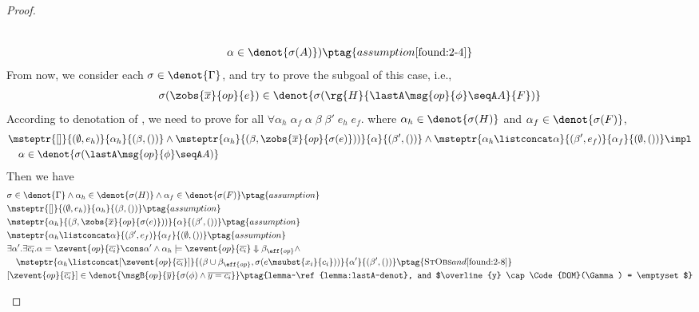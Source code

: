\begin{proof}
\begin{enumerate}[label=Case]
{\begin{alignat}{2}
\\&\quad \alpha \in\denot{\sigma(A)}) \ptag{assumption \ref{found:2-4}} \label{found:2-5}
\end{alignat}}\noindent
From now, we consider each $\sigma \in \denot{\Gamma}$, and try to prove the subgoal of this case, i.e., 
{\footnotesize\begin{align*}
    \sigma(\zobs{\overline{x}}{op}{e}) \in \denot{\sigma(\rg{H}{\lastA\msg{op}{\phi} \seqA A}{F})}
\end{align*}}\noindent
According to denotation of \PAT, we need to prove for all $\forall \alpha_h\;\alpha_f\;\alpha\;\beta\;\beta'\;e_h\;e_f.$ where $\alpha_h \in \denot{\sigma(H)}$ and $\alpha_f \in \denot{\sigma(F)}$, 
{\footnotesize\begin{align*}
&\msteptr{[]}{(\emptyset, e_h)}{\alpha_h}{(\beta, ())} \land \msteptr{\alpha_h}{(\beta, \zobs{\overline{x}}{op}{\sigma(e)}))}{\alpha}{(\beta', ())} \land \msteptr{\alpha_h \listconcat \alpha }{(\beta', e_f)}{\alpha_f}{(\emptyset, ())} \impl \notag 
\\&\quad \alpha \in\denot{\sigma(\lastA\msg{op}{\phi} \seqA A)}
\end{align*}}\noindent
Then we have
{\footnotesize\begin{alignat}{2}
&\sigma \in \denot{\Gamma} \land \alpha_h \in \denot{\sigma(H)} \land  \alpha_f \in \denot{\sigma(F)} \ptag{assumption} \label{found:2-6}
\\& \msteptr{[]}{(\emptyset, e_h)}{\alpha_h}{(\beta, ())} \ptag{assumption} \label{found:2-7}
\\& \msteptr{\alpha_h}{(\beta, \zobs{\overline{x}}{op}{\sigma(e)}))}{\alpha}{(\beta', ())} \ptag{assumption} \label{found:2-8}
\\& \msteptr{\alpha_h \listconcat \alpha }{(\beta', e_f)}{\alpha_f}{(\emptyset, ())} \ptag{assumption} \label{found:2-9}
\\& \exists \alpha'.\exists \overline{c_i}. \alpha = \zevent{op}{\overline{c_i}} \cons \alpha' \land 
\alpha_h \models \zevent{op}{\overline{c_i}} \Downarrow \beta_{\eff{op}} \land \notag
\\&\quad\msteptr{\alpha_h \listconcat [\zevent{op}{\overline{c_i}}]}{(\beta \cup \beta_{\eff{op}}, \sigma(e\msubst{x_i}{c_i}))}{\alpha'}{(\beta', ())} \ptag{\textsc{StObs} and \ref{found:2-8}} \label{found:2-10}
\\& [\zevent{op}{\overline{c_i}}] \in \denot{\msgB{op}{\overline{y}}{\sigma(\phi) \land \overline{y = c_i}}} \ptag{lemma~\ref{lemma:lastA-denot}, and $\overline{y} \cap \Code{DOM}(\Gamma) = \emptyset$} \label{found:1-11}

\end{alignat}}
\end{enumerate}
\end{proof}
